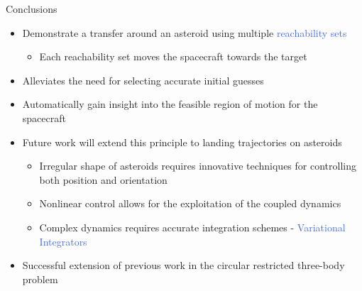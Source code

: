\documentclass[final, usenames, dvipsnames]{beamer}
\newlength{\onecolwidth}
\def\Emph{\textcolor{RoyalBlue}}
\begin{document}
\begin{frame}[t]
\begin{columns}[T,onlytextwidth]
\begin{column}{\onecolwidth}
\begin{block}{Conclusions} %
	\begin{itemize}
		\item Demonstrate a transfer around an asteroid using multiple \Emph{reachability sets}
        \begin{itemize}
            \item Each reachability set moves the spacecraft towards the target
        \end{itemize}
        \item Alleviates the need for selecting accurate initial guesses 
		\item Automatically gain insight into the feasible region of motion for the spacecraft
        \item Future work will extend this principle to landing trajectories on asteroids
        \begin{itemize}
            \item Irregular shape of asteroids requires innovative techniques for controlling both position and orientation
            \item Nonlinear control allows for the exploitation of the coupled dynamics
            \item Complex dynamics requires accurate integration schemes - \Emph{Variational Integrators}
        \end{itemize}
        \item Successful extension of previous work in the circular restricted three-body problem
	\end{itemize}
\end{block} %
\end{column}  %

\end{columns} %
\end{frame} %
\end{document}

